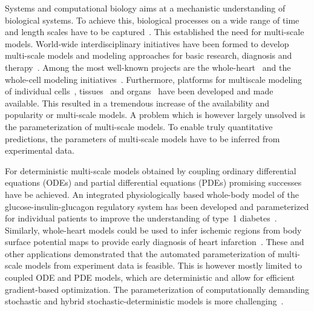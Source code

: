 \documentclass[10pt,letterpaper]{article}
\begin{document}
Systems and computational biology aims at a mechanistic understanding of biological systems. To achieve this, biological processes on a wide range of time and length scales have to be captured~\cite{HunterBor2003}. This established the need for multi-scale models. World-wide interdisciplinary initiatives have been formed to develop multi-scale models and modeling approaches for basic research, diagnosis and therapy~\cite{PhysiomeProject}. Among the most well-known projects are the whole-heart~\cite{HunterBor2003,Nobel2002,Trayanova2011} and the whole-cell modeling initiatives~\cite{TomitaHas1999,KarrSan2012}. Furthermore, platforms for multiscale modeling of individual cells~\cite{StilesBar2001,SchaffFin1997}, tissues~\cite{RichmondWal2010,SwatTho2012,StarrussBac2014} and organs~\cite{MiramsArt2013} have been developed and made available. This resulted in a tremendous increase of the availability and popularity or multi-scale models. A problem which is however largely unsolved is the parameterization of multi-scale models. To enable truly quantitative predictions, the parameters of multi-scale models have to be inferred from experimental data.

For deterministic multi-scale models obtained by coupling ordinary differential equations (ODEs) and partial differential equations (PDEs) promising successes have be achieved. An integrated physiologically based whole-body model of the glucose-insulin-glucagon regulatory system has been developed and parameterized for individual patients to improve the understanding of type~1 diabetes~\cite{SchallerWil2013}. Similarly, whole-heart models could be used to infer ischemic regions from body surface potential maps to provide early diagnosis of heart infarction~\cite{NielsenLys2013}. These and other applications demonstrated that the automated parameterization of multi-scale models from experiment data is feasible. This is however mostly limited to coupled ODE and PDE models, which are deterministic and allow for efficient gradient-based optimization. The parameterization of computationally demanding stochastic and hybrid stochastic-deterministic models is more challenging~\cite{AdraKir2011,KarrWil2015}.
\end{document}
